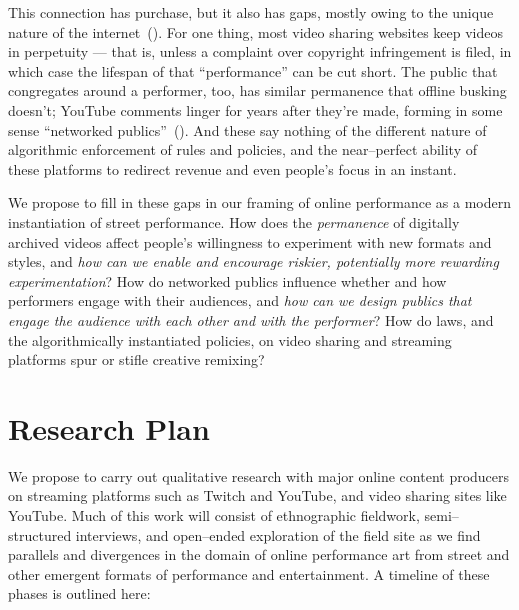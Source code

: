 \documentclass[10pt]{article}
\begin{document}
This connection has purchase, but it also has gaps, mostly owing to the unique nature of the internet~(\cite{miller2011understanding}).
For one thing, most video sharing websites keep videos
in perpetuity
--- that is, unless a complaint over copyright infringement is filed, in which case the lifespan of that ``performance'' can be cut short.
The public that congregates around a performer, too, has similar permanence that offline busking doesn't;
YouTube comments linger for years after they're made, forming in some sense ``networked publics''~(\cite{boyd2007youth}).
And these say nothing of the different nature of algorithmic enforcement of rules and policies, and
the near--perfect ability of these platforms to redirect revenue and even people's focus in an instant.

We propose to fill in these gaps in our framing of online performance as a modern instantiation of street performance.
How does the \textit{permanence} of digitally archived videos affect people's willingness to experiment with new formats and styles,
and \textit{how can we enable and encourage riskier, potentially more rewarding experimentation}?
How do networked publics influence whether and how performers engage with their audiences,
and \textit{how can we design publics that engage the audience with each other and with the performer}?
How do laws, and the algorithmically instantiated policies, on video sharing and streaming platforms spur or stifle creative remixing?

\section*{Research Plan}
We propose to carry out qualitative research with major online content producers
on streaming platforms such as Twitch and YouTube, and video sharing sites like YouTube.
Much of this work will consist of ethnographic fieldwork, semi--structured interviews, and
open--ended exploration of the field site as we find parallels and divergences in the domain
of online performance art from street and other emergent formats of performance and entertainment.
A timeline of these phases is outlined here:

\vspace*{5pt}
\end{document}
